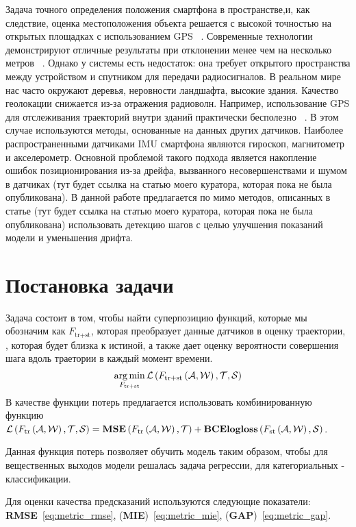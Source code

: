 \documentclass[12pt, twoside]{article}
\begin{document}
Задача точного определения положения смартфона в пространстве,и, как следствие, оценка местоположения объекта решается с высокой точностью на открытых площадках с использованием GPS ~\cite{mohamed1999adaptive}. Современные технологии демонстрируют отличные результаты при отклонении менее чем на несколько метров ~\cite{rahiman2013overview}. Однако у системы есть недостаток: она требует открытого пространства между устройством и спутником для передачи радиосигналов. В реальном мире нас часто окружают деревья, неровности ландшафта, высокие здания. Качество геолокации снижается из-за отражения радиоволн. Например, использование GPS для отслеживания траекторий внутри зданий практически бесполезно ~\cite{dedes2005indoor}. В этом случае используются методы, основанные на данных других датчиков. Наиболее распространенными датчиками IMU смартфона являются гироскоп, магнитометр и акселерометр. Основной проблемой такого подхода является накопление ошибок позиционирования из-за дрейфа, вызванного несовершенствами и шумом в датчиках (тут будет ссылка на статью моего куратора, которая пока не была опубликована). В данной работе предлагается по мимо методов, описанных в статье  (тут будет ссылка на статью моего куратора, которая пока не была опубликована) использовать детекцию шагов с целью улучшения показаний модели и уменьшения дрифта.

\section{Постановка задачи}

Задача состоит в том, чтобы найти суперпозицию функций, которые мы обозначим как $F_{\text{tr+st}}$, которая преобразует данные датчиков в оценку траектории, , которая будет близка к истиной, а также дает оценку вероятности совершения шага вдоль траетории в каждый момент времени.
\begin{equation}
    \label{eq:general_ps}
    \argmin\limits_{F_{\text{tr+st}}}\mathcal{L}\left(F_{\text{tr+st}}\left(\cal{A}, \cal{W}\right), \cal{T}, \cal{S}\right)
\end{equation}{}
\newpage
В качестве функции потерь предлагается использовать комбинированную функцию  $\mathcal{L}\left(F_{\text{tr}}\left(\cal{A}, \cal{W}\right), \cal{T}, \cal{S}\right) = \textbf{MSE}\left(F_{\text{tr}}\left(\cal{A}, \cal{W}\right), \cal{T}\right) + \textbf{BCElogloss}\left(F_{\text{st}}\left(\cal{A}, \cal{W}\right), \cal{S}\right)$.

Данная функция потерь позволяет обучить модель таким образом, чтобы для вещественных выходов модели решалась задача регрессии, для категориальных - классификации. 

Для оценки качества предсказаний используются следующие показатели:  \textbf{RMSE}~\eqref{eq:metric_rmse}, (\textbf{MIE})~\eqref{eq:metric_mie}, (\textbf{GAP})~\eqref{eq:metric_gap}.





\end{document}
